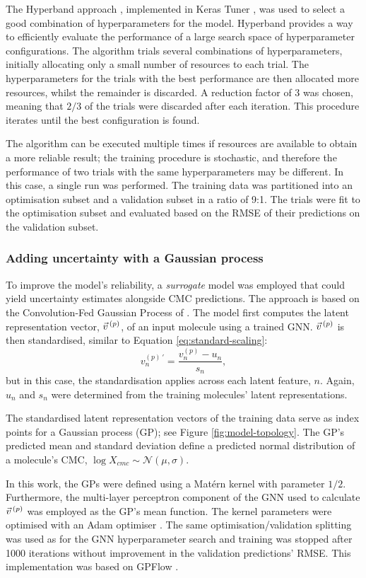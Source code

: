 The Hyperband approach \cite{liHyperbandNovelBanditBased2018}, implemented in Keras Tuner \cite{cholletKeras2015}, was used to select a good combination of hyperparameters for the model. Hyperband provides a way to efficiently evaluate
the performance of a large search space of hyperparameter configurations. The algorithm trials several combinations of hyperparameters, initially allocating only a small number of resources to each trial. The hyperparameters for the
trials with the best performance are then allocated more resources, whilst the remainder is discarded. A reduction factor of 3 was chosen, meaning that $2/3$ of the trials were discarded after each iteration. This procedure iterates until the best configuration is found.

The algorithm can be executed multiple times if resources are available to obtain a more reliable result; the training procedure is stochastic, and therefore the performance of two trials with the same hyperparameters may be different. In this case, a single run was performed. The training data was partitioned into an optimisation subset and a validation subset in a ratio of 9:1. The trials were fit to the optimisation subset and evaluated based on the RMSE of their predictions on the validation subset.

\subsubsection{Adding uncertainty with a Gaussian process}

To improve the model's reliability, a \emph{surrogate} model was employed that could yield uncertainty estimates alongside CMC predictions. The approach is based on the Convolution-Fed Gaussian Process of \citet{tranMethodsComparingUncertainty2020}. The model first computes the latent representation vector, $\vec{v}^{\,(p)}{}$, of an input molecule using a trained GNN. $\vec{v}^{\,(p)}{}$ is then standardised, similar to Equation \ref{eq:standard-scaling}:
\begin{equation}
    v^{(p)\,\prime}_n = \frac{v^{(p)}_n - u_n}{s_n},
\end{equation}
but in this case, the standardisation applies across each latent feature, $n$.
Again, $u_n$ and $s_n$ were determined from the training molecules' latent representations.

The standardised latent representation vectors of the training data serve as index points for a Gaussian process (GP); see Figure \ref{fig:model-topology}.
The GP's predicted mean and standard deviation define a predicted normal distribution of a molecule's CMC, $\log X_{cmc} \sim \mathcal{N}(\mu, \sigma)$.

In this work, the GPs  were defined using a Mat\'ern kernel with parameter $1/2$. Furthermore, the multi-layer perceptron component of the GNN used to calculate $\vec{v}^{\,(p)}{}$ was employed as the GP's mean function.
The kernel parameters were optimised with an Adam optimiser \cite{kingmaAdamMethodStochastic2017a}.
The same optimisation/validation splitting was used as for the GNN hyperparameter search and training was stopped after \num{1000} iterations without improvement in the validation predictions' RMSE. This implementation was based on GPFlow \cite{matthewsGPflowGaussianProcess2017}.